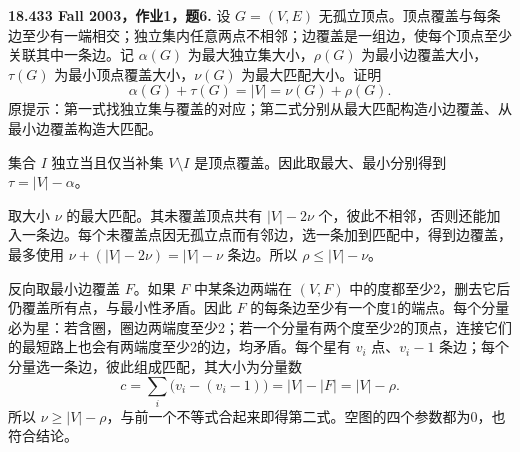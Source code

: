 \begin{exercise}\label{mit:18433-a1-q6}
\textbf{18.433 Fall 2003，作业1，题6.}
设 $G=(V,E)$ 无孤立顶点。顶点覆盖与每条边至少有一端相交；独立集内任意两点不相邻；边覆盖是一组边，使每个顶点至少关联其中一条边。记 $\alpha(G)$ 为最大独立集大小，$\rho(G)$ 为最小边覆盖大小，$\tau(G)$ 为最小顶点覆盖大小，$\nu(G)$ 为最大匹配大小。证明
\[
 \alpha(G)+\tau(G)=|V|=\nu(G)+\rho(G).
\]
原提示：第一式找独立集与覆盖的对应；第二式分别从最大匹配构造小边覆盖、从最小边覆盖构造大匹配。
\end{exercise}
\begin{solution}
集合 $I$ 独立当且仅当补集 $V\setminus I$ 是顶点覆盖。因此取最大、最小分别得到 $\tau=|V|-\alpha$。

取大小 $\nu$ 的最大匹配。其未覆盖顶点共有 $|V|-2\nu$ 个，彼此不相邻，否则还能加入一条边。每个未覆盖点因无孤立点而有邻边，选一条加到匹配中，得到边覆盖，最多使用
$\nu+(|V|-2\nu)=|V|-\nu$ 条边。所以 $\rho\le|V|-\nu$。

反向取最小边覆盖 $F$。如果 $F$ 中某条边两端在 $(V,F)$ 中的度都至少2，删去它后仍覆盖所有点，与最小性矛盾。因此 $F$ 的每条边至少有一个度1的端点。每个分量必为星：若含圈，圈边两端度至少2；若一个分量有两个度至少2的顶点，连接它们的最短路上也会有两端度至少2的边，均矛盾。每个星有 $v_i$ 点、$v_i-1$ 条边；每个分量选一条边，彼此组成匹配，其大小为分量数
\[
 c=\sum_i\bigl(v_i-(v_i-1)\bigr)=|V|-|F|=|V|-\rho.
\]
所以 $\nu\ge|V|-\rho$，与前一个不等式合起来即得第二式。空图的四个参数都为0，也符合结论。
\end{solution}

